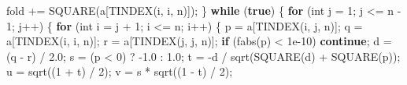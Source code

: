 \documentclass[
  12pt,
  letterpaper,
  DIV=11,
  numbers=noendperiod]{scrreprt}
\newenvironment{Shaded}{\begin{snugshade}}{\end{snugshade}}
\newcommand{\ControlFlowTok}[1]{\textcolor[rgb]{0.00,0.23,0.31}{\textbf{#1}}}
\newcommand{\DataTypeTok}[1]{\textcolor[rgb]{0.68,0.00,0.00}{#1}}
\newcommand{\DecValTok}[1]{\textcolor[rgb]{0.68,0.00,0.00}{#1}}
\newcommand{\FloatTok}[1]{\textcolor[rgb]{0.68,0.00,0.00}{#1}}
\newcommand{\KeywordTok}[1]{\textcolor[rgb]{0.00,0.23,0.31}{\textbf{#1}}}
\newcommand{\NormalTok}[1]{\textcolor[rgb]{0.00,0.23,0.31}{#1}}
\newcommand{\OperatorTok}[1]{\textcolor[rgb]{0.37,0.37,0.37}{#1}}
\theoremstyle{remark}
\begin{document}
\begin{Shaded}
\begin{Highlighting}[]
\NormalTok{        fold }\OperatorTok{+=}\NormalTok{ SQUARE}\OperatorTok{(}\NormalTok{a}\OperatorTok{[}\NormalTok{TINDEX}\OperatorTok{(}\NormalTok{i}\OperatorTok{,}\NormalTok{ i}\OperatorTok{,}\NormalTok{ n}\OperatorTok{)]);}
    \OperatorTok{\}}
    \ControlFlowTok{while} \OperatorTok{(}\KeywordTok{true}\OperatorTok{)} \OperatorTok{\{}
        \ControlFlowTok{for} \OperatorTok{(}\DataTypeTok{int}\NormalTok{ j }\OperatorTok{=} \DecValTok{1}\OperatorTok{;}\NormalTok{ j }\OperatorTok{\textless{}=}\NormalTok{ n }\OperatorTok{{-}} \DecValTok{1}\OperatorTok{;}\NormalTok{ j}\OperatorTok{++)} \OperatorTok{\{}
            \ControlFlowTok{for} \OperatorTok{(}\DataTypeTok{int}\NormalTok{ i }\OperatorTok{=}\NormalTok{ j }\OperatorTok{+} \DecValTok{1}\OperatorTok{;}\NormalTok{ i }\OperatorTok{\textless{}=}\NormalTok{ n}\OperatorTok{;}\NormalTok{ i}\OperatorTok{++)} \OperatorTok{\{}
\NormalTok{                p }\OperatorTok{=}\NormalTok{ a}\OperatorTok{[}\NormalTok{TINDEX}\OperatorTok{(}\NormalTok{i}\OperatorTok{,}\NormalTok{ j}\OperatorTok{,}\NormalTok{ n}\OperatorTok{)];}
\NormalTok{                q }\OperatorTok{=}\NormalTok{ a}\OperatorTok{[}\NormalTok{TINDEX}\OperatorTok{(}\NormalTok{i}\OperatorTok{,}\NormalTok{ i}\OperatorTok{,}\NormalTok{ n}\OperatorTok{)];}
\NormalTok{                r }\OperatorTok{=}\NormalTok{ a}\OperatorTok{[}\NormalTok{TINDEX}\OperatorTok{(}\NormalTok{j}\OperatorTok{,}\NormalTok{ j}\OperatorTok{,}\NormalTok{ n}\OperatorTok{)];}
                \ControlFlowTok{if} \OperatorTok{(}\NormalTok{fabs}\OperatorTok{(}\NormalTok{p}\OperatorTok{)} \OperatorTok{\textless{}} \FloatTok{1e{-}10}\OperatorTok{)} \ControlFlowTok{continue}\OperatorTok{;}
\NormalTok{                d }\OperatorTok{=} \OperatorTok{(}\NormalTok{q }\OperatorTok{{-}}\NormalTok{ r}\OperatorTok{)} \OperatorTok{/} \FloatTok{2.0}\OperatorTok{;}
\NormalTok{                s }\OperatorTok{=} \OperatorTok{(}\NormalTok{p }\OperatorTok{\textless{}} \DecValTok{0}\OperatorTok{)} \OperatorTok{?} \OperatorTok{{-}}\FloatTok{1.0} \OperatorTok{:} \FloatTok{1.0}\OperatorTok{;}
\NormalTok{                t }\OperatorTok{=} \OperatorTok{{-}}\NormalTok{d }\OperatorTok{/}\NormalTok{ sqrt}\OperatorTok{(}\NormalTok{SQUARE}\OperatorTok{(}\NormalTok{d}\OperatorTok{)} \OperatorTok{+}\NormalTok{ SQUARE}\OperatorTok{(}\NormalTok{p}\OperatorTok{));}
\NormalTok{                u }\OperatorTok{=}\NormalTok{ sqrt}\OperatorTok{((}\DecValTok{1} \OperatorTok{+}\NormalTok{ t}\OperatorTok{)} \OperatorTok{/} \DecValTok{2}\OperatorTok{);}
\NormalTok{                v }\OperatorTok{=}\NormalTok{ s }\OperatorTok{*}\NormalTok{ sqrt}\OperatorTok{((}\DecValTok{1} \OperatorTok{{-}}\NormalTok{ t}\OperatorTok{)} \OperatorTok{/} \DecValTok{2}\OperatorTok{);}

\end{Highlighting}
\end{Shaded}
\end{document}
